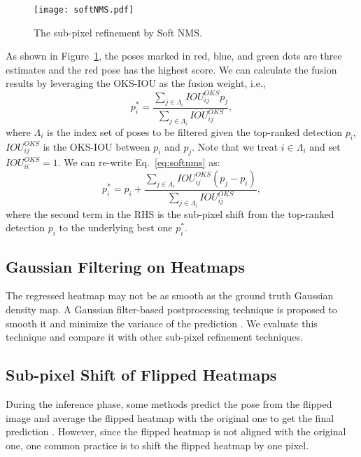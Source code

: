 \documentclass[twocolumn]{svjour3}          \smartqed  \usepackage{natbib}
\begin{document}
\begin{figure}[t]
\centering
\texttt{[image: softNMS.pdf]}
\caption{The sub-pixel refinement by Soft NMS.}
\label{fig:softnms}
\end{figure}

As shown in Figure~\ref{fig:softnms}, the poses marked in red, blue, and green dots are three estimates and the red pose has the highest score. We can calculate the fusion results by leveraging the OKS-IOU as the fusion weight, i.e.,
\begin{equation}
p_i^* = \frac{{\sum\limits_{j \in {\Lambda _i}} {IOU_{ij}^{OKS}{p_j}} }}{{\sum\limits_{j \in {\Lambda _i}} {IOU_{ij}^{OKS}} }},
\label{eq:softnms}
\end{equation}
where ${{\Lambda _i}}$ is the index set of poses to be filtered given the top-ranked detection $p_i$, $IOU_{ij}^{OKS}$ is the OKS-IOU between $p_i$ and $p_j$. Note that we treat ${i \in {\Lambda _i}}$ and set $IOU_{ii}^{OKS} = 1$. We can re-write Eq.~\eqref{eq:softnms} as:
\begin{equation}
p_i^* = {p_i} + \frac{{\sum\limits_{j \in {\Lambda _i}} {IOU_{ij}^{OKS}\left( {{p_j} - {p_i}} \right)} }}{{\sum\limits_{j \in {\Lambda _i}} {IOU_{ij}^{OKS}} }},
\label{eq:softnms2}
\end{equation}
where the second term in the RHS is the sub-pixel shift from the top-ranked detection $p_i$ to the underlying best one $p_i^*$.


\subsection{Gaussian Filtering on Heatmaps}
\label{subsec:gb}
The regressed heatmap may not be as smooth as the ground truth Gaussian density map. A Gaussian filter-based postprocessing technique is proposed to smooth it and minimize the variance of the prediction \citep{chen2018cascaded,li2019rethinking}. We evaluate this technique and compare it with other sub-pixel refinement techniques.

\subsection{Sub-pixel Shift of Flipped Heatmaps}
\label{subsec:flipshit}

During the inference phase, some methods predict the pose from the flipped image and average the flipped heatmap with the original one to get the final prediction \citep{chen2018cascaded, xiao2018simple}. However, since the flipped heatmap is not aligned with the original one, one common practice is to shift the flipped heatmap by one pixel.
\end{document}
